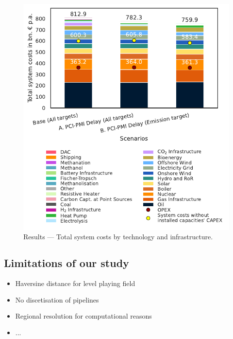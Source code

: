 \documentclass[preprint,12pt]{elsarticle}
\begin{document}
\begin{figure}[htbp]
  \centering
  \includegraphics[width=\linewidth]{system_costs}
  \caption{Results --- Total system costs by technology and infrastructure.}
  \label{fig:system_costs}
\end{figure}

\subsection{Limitations of our study}
\begin{itemize}
  \item Haversine distance for level playing field
  \item No discetisation of pipelines
  \item Regional resolution for computational reasons
  \item ...
\end{itemize}

\newpage
\end{document}
